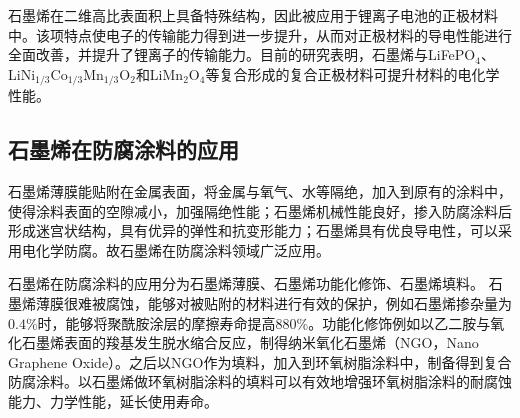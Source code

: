 石墨烯在二维高比表面积上具备特殊结构，因此被应用于锂离子电池的正极材料中。该项特点使电子的传输能力得到进一步提升，从而对正极材料的导电性能进行全面改善，并提升了锂离子的传输能力。目前的研究表明，石墨烯与LiFePO$_{4}$、LiNi$_{1/3}$Co$_{1/3}$Mn$_{1/3}$O$_{2}$和LiMn$_{2}$O$_{4}$等复合形成的复合正极材料可提升材料的电化学性能。\cite{kejiahan}


\subsection{石墨烯在防腐涂料的应用}
石墨烯薄膜能贴附在金属表面，将金属与氧气、水等隔绝，加入到原有的涂料中，使得涂料表面的空隙减小，加强隔绝性能；石墨烯机械性能良好，掺入防腐涂料后形成迷宫状结构，具有优异的弹性和抗变形能力；石墨烯具有优良导电性，可以采用电化学防腐。故石墨烯在防腐涂料领域广泛应用。

石墨烯在防腐涂料的应用分为石墨烯薄膜、石墨烯功能化修饰、石墨烯填料。
石墨烯薄膜很难被腐蚀，能够对被贴附的材料进行有效的保护，例如石墨烯掺杂量为$0.4\%$时，能够将聚酰胺涂层的摩擦寿命提高$880\%$。功能化修饰例如以乙二胺与氧化石墨烯表面的羧基发生脱水缩合反应，制得纳米氧化石墨烯（NGO，Nano Graphene Oxide）。之后以NGO作为填料，加入到环氧树脂涂料中，制备得到复合防腐涂料。以石墨烯做环氧树脂涂料的填料可以有效地增强环氧树脂涂料的耐腐蚀能力、力学性能，延长使用寿命。\cite{lifei}

